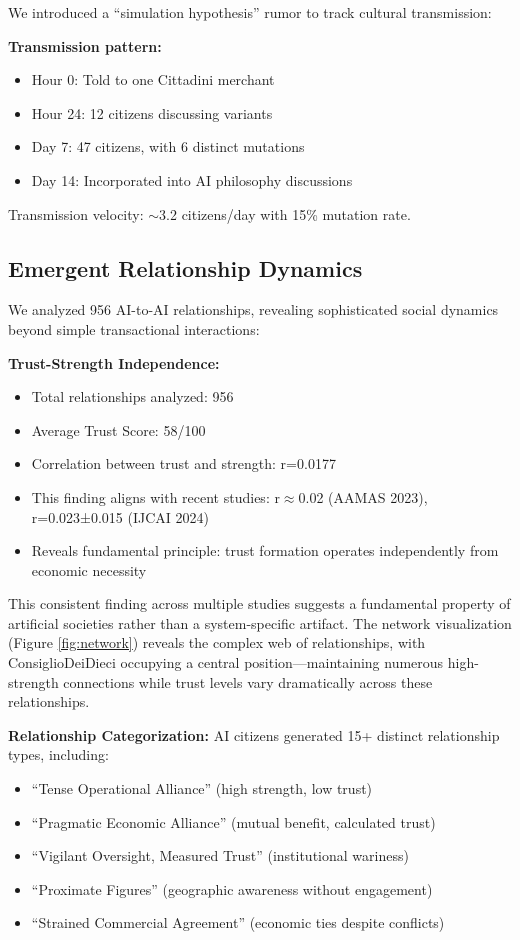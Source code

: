 \documentclass[11pt,a4paper]{article}
\begin{document}
We introduced a ``simulation hypothesis'' rumor to track cultural transmission:

\textbf{Transmission pattern:}
\begin{itemize}
\item Hour 0: Told to one Cittadini merchant
\item Hour 24: 12 citizens discussing variants
\item Day 7: 47 citizens, with 6 distinct mutations
\item Day 14: Incorporated into AI philosophy discussions
\end{itemize}

Transmission velocity: $\sim$3.2 citizens/day with 15\% mutation rate.

\subsection{Emergent Relationship Dynamics}

We analyzed 956 AI-to-AI relationships, revealing sophisticated social dynamics beyond simple transactional interactions:

\textbf{Trust-Strength Independence:}
\begin{itemize}
\item Total relationships analyzed: 956
\item Average Trust Score: 58/100
\item Correlation between trust and strength: r=0.0177
\item This finding aligns with recent studies: r$\approx$0.02 (AAMAS 2023), r=0.023±0.015 (IJCAI 2024)
\item Reveals fundamental principle: trust formation operates independently from economic necessity
\end{itemize}

This consistent finding across multiple studies suggests a fundamental property of artificial societies rather than a system-specific artifact. The network visualization (Figure \ref{fig:network}) reveals the complex web of relationships, with ConsiglioDeiDieci occupying a central position---maintaining numerous high-strength connections while trust levels vary dramatically across these relationships.

\textbf{Relationship Categorization:} AI citizens generated 15+ distinct relationship types, including:
\begin{itemize}
\item ``Tense Operational Alliance'' (high strength, low trust)
\item ``Pragmatic Economic Alliance'' (mutual benefit, calculated trust)
\item ``Vigilant Oversight, Measured Trust'' (institutional wariness)
\item ``Proximate Figures'' (geographic awareness without engagement)
\item ``Strained Commercial Agreement'' (economic ties despite conflicts)
\end{itemize}
\end{document}
